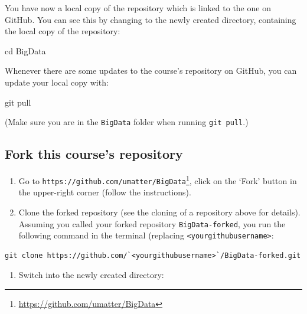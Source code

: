 \documentclass[
  12pt,
]{style/krantz}
\newenvironment{Shaded}{\begin{snugshade}}{\end{snugshade}}
\newcommand{\BuiltInTok}[1]{#1}
\newcommand{\FunctionTok}[1]{\textcolor[rgb]{0.00,0.00,0.00}{#1}}
\newcommand{\NormalTok}[1]{#1}
\providecommand{\tightlist}{%
  \setlength{\itemsep}{0pt}\setlength{\parskip}{0pt}}
\renewcommand{\href}[2]{#2\footnote{\url{#1}}}
\begin{document}
You have now a local copy of the repository which is linked to the one on GitHub. You can see this by changing to the newly created directory, containing the local copy of the repository:

\begin{Shaded}
\begin{Highlighting}[]
\BuiltInTok{cd}\NormalTok{ BigData}
\end{Highlighting}
\end{Shaded}

Whenever there are some updates to the course's repository on GitHub, you can update your local copy with:

\begin{Shaded}
\begin{Highlighting}[]
\FunctionTok{git}\NormalTok{ pull}
\end{Highlighting}
\end{Shaded}

(Make sure you are in the \texttt{BigData} folder when running \texttt{git\ pull}.)

\hypertarget{fork-this-courses-repository}{%
\subsection{Fork this course's repository}\label{fork-this-courses-repository}}

\begin{enumerate}
\def\labelenumi{\arabic{enumi}.}
\item
  Go to \href{https://github.com/umatter/BigData}{\texttt{https://github.com/umatter/BigData}}, click on the `Fork' button in the upper-right corner (follow the instructions).
\item
  Clone the forked repository (see the cloning of a repository above for details). Assuming you called your forked repository \texttt{BigData-forked}, you run the following command in the terminal (replacing \texttt{\textless{}yourgithubusername\textgreater{}}:
\end{enumerate}

\begin{verbatim}
git clone https://github.com/`<yourgithubusername>`/BigData-forked.git
\end{verbatim}

\begin{enumerate}
\def\labelenumi{\arabic{enumi}.}
\setcounter{enumi}{2}
\tightlist
\item
  Switch into the newly created directory:
\end{enumerate}
\end{document}
